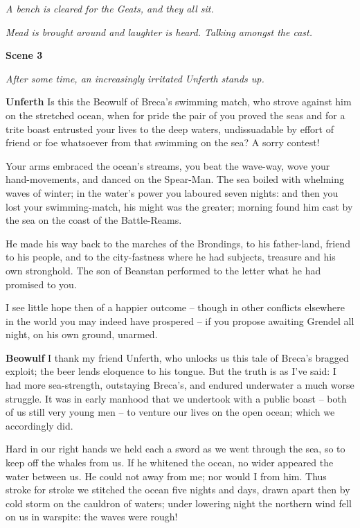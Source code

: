 \documentclass[a4paper]{article}
\begin{document}
{\centerline{\textit{A bench is cleared for the Geats, and they all sit.}}
\centerline{\textit{Mead is brought around and laughter is heard. Talking amongst the cast.}}

\centerline{\textbf{Scene 3}}
\centerline{\textit{After some time, an increasingly irritated Unferth stands up.}}

\textbf{Unferth} Is this the Beowulf of Breca's swimming match, 
who strove against him on the stretched ocean,
when for pride the pair of you proved the seas
and for a trite boast entrusted your lives
to the deep waters, undissuadable
by effort of friend or foe whatsoever
from that swimming on the sea? A sorry contest!

Your arms embraced the ocean’s streams,
you beat the wave-way, wove your hand-movements,
and danced on the Spear-Man. The sea boiled with whelming
waves of winter; in the water’s power
you laboured seven nights: and then you lost your swimming-match,
his might was the greater; morning found him
cast by the sea on the coast of the Battle-Reams.

He made his way back to the marches of the Brondings,
to his father-land, friend to his people,
and to the city-fastness where he had subjects, treasure
and his own stronghold. The son of Beanstan
performed to the letter what he had promised to you.

I see little hope then of a happier outcome
– though in other conflicts elsewhere in the world
you may indeed have prospered – if you propose awaiting
Grendel all night, on his own ground, unarmed.

\textbf{Beowulf} I thank my friend Unferth, who unlocks us this tale
of Breca's bragged exploit; 
the beer lends eloquence to his tongue.
But the truth is as I’ve said:
I had more sea-strength, outstaying Breca’s,
and endured underwater a much worse struggle.
    It was in early manhood that we undertook
with a public boast – both of us still
very young men – to venture our lives
on the open ocean; which we accordingly did.

Hard in our right hands we held each a sword
as we went through the sea, so to keep off
the whales from us. If he whitened the ocean,
no wider appeared the water between us.
He could not away from me; nor would I from him.
Thus stroke for stroke we stitched the ocean
five nights and days, drawn apart then
by cold storm on the cauldron of waters;
under lowering night the northern wind
fell on us in warspite: the waves were rough!

}
\end{document}

